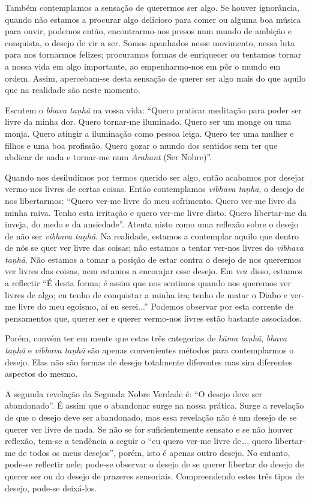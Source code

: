 Também contemplamos a sensação de querermos ser algo. Se houver ignorância,
quando não estamos a procurar algo delicioso para comer ou alguma boa música
para ouvir, podemos então, encontrarmo-nos presos num mundo de ambição e
conquista, o desejo de vir a ser. Somos apanhados nesse movimento, nessa luta
para nos tornarmos felizes; procuramos formas de enriquecer ou tentamos tornar a
nossa vida em algo importante, ao empenharmo-nos em pôr o mundo em ordem. Assim,
apercebam-se desta sensação de querer ser algo mais do que aquilo que na
realidade são neste momento.

Escutem o \emph{bhava taṇhā} na vossa vida: “Quero praticar meditação para poder
ser livre da minha dor. Quero tornar-me iluminado. Quero ser um monge ou uma
monja. Quero atingir a iluminação como pessoa leiga. Quero ter uma mulher e
filhos e uma boa profissão. Quero gozar o mundo dos sentidos sem ter que abdicar
de nada e tornar-me num \emph{Arahant} (Ser Nobre)”.

Quando nos desiludimos por termos querido ser algo, então acabamos por desejar
vermo-nos livres de certas coisas. Então contemplamos \emph{vibhava taṇhā}, o
desejo de nos libertarmos: “Quero ver-me livre do meu sofrimento. Quero ver-me
livre da minha raiva. Tenho esta irritação e quero ver-me livre disto. Quero
libertar-me da inveja, do medo e da ansiedade”. Atenta nisto como uma reflexão
sobre o desejo de não ser \emph{vibhava taṇhā}. Na realidade, estamos a
contemplar aquilo que dentro de nós se quer ver livre das coisas; não estamos a
tentar ver-nos livres do \emph{vibhava taṇhā}. Não estamos a tomar a posição de
estar contra o desejo de nos querermos ver livres das coisas, nem estamos a
encorajar esse desejo. Em vez disso, estamos a reflectir “É desta forma; é assim
que nos sentimos quando nos queremos ver livres de algo; eu tenho de conquistar
a minha ira; tenho de matar o Diabo e ver-me livre do meu egoísmo, aí eu
serei...” Podemos observar por esta corrente de pensamentos que, querer ser e
querer vermo-nos livres estão bastante associados.

Porém, convém ter em mente que estas três categorias de \emph{kāma taṇhā},
\emph{bhava taṇhā} e \emph{vibhava taṇhā} são apenas convenientes métodos para
contemplarmos o desejo. Elas não são formas de desejo totalmente diferentes mas
sim diferentes aspectos do mesmo.

A segunda revelação da Segunda Nobre Verdade é: “O desejo deve ser abandonado”.
É assim que o abandonar surge na nossa prática. Surge a revelação de que o
desejo deve ser abandonado, mas essa revelação não é um desejo de se querer ver
livre de nada. Se não se for suficientemente sensato e se não houver reflexão,
tem-se a tendência a seguir o “eu quero ver-me livre de\ldots{}, quero
libertar-me de todos os meus desejos”, porém, isto é apenas outro desejo. No
entanto, pode-se reflectir nele; pode-se observar o desejo de se querer libertar
do desejo de querer ser ou do desejo de prazeres sensoriais. Compreendendo estes
três tipos de desejo, pode-se deixá-los.

